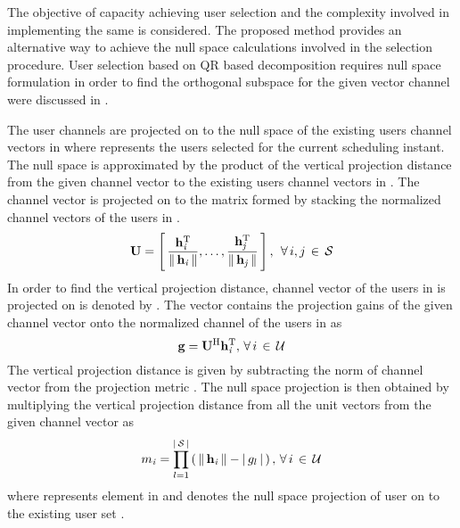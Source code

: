 
The objective of capacity achieving user selection and the complexity involved in implementing the same is considered. The proposed method provides an alternative way to achieve the null space calculations involved in the selection procedure. User selection based on QR based decomposition requires null space formulation in order to find the orthogonal subspace for the given vector channel were discussed in \cite{traniterative,zhang2007user,sun2009eigenmode,antti_user_selection}.

The user channels are projected on to the null space of the existing users channel vectors in  where  represents the users selected for the current scheduling instant. The null space is approximated by the product of the vertical projection distance from the given channel vector to the existing users channel vectors in . The channel vector  is projected on to the matrix  formed by stacking the normalized channel vectors of the users in .
\begin{equation}
\mathbf{U} = \left [ \, \frac{\mathbf{h}_{\mathit{i}}^{\mathrm{T}}}{\|\, \mathbf{h}_{\mathit{i}} \,\|}, \dotsc, \frac{\mathbf{h}_{\mathit{j}}^{\mathrm{T}}}{\|\, \mathbf{h}_{\mathit{j}} \,\|} \, \right ], \; \, \forall \, i,j \, \in \, \mathcal{S}
\label{mca2-e1}
\end{equation}
In order to find the vertical projection distance, channel vector of the users in  is projected on  is  denoted by . The vector  contains the projection gains of the given channel vector onto the normalized channel of the users in  as
\begin{equation}
\mathbf{g} = \mathbf{U}^{\mathrm{H}} \mathbf{h}_{\mathit{i}}^{\mathrm{T}}, \, \forall \, i \, \in \, \mathcal{U}
\label{mca2-e2}
\end{equation}
The vertical projection distance is given by subtracting the norm of channel vector from the projection metric . The null space projection is then obtained by multiplying the vertical projection distance from all the unit vectors from the given channel vector as
\begin{equation}
{m}_{\mathit{i}} = \prod^{| \, \mathcal{S} \, |}_{l = 1} \left ( \, \|\, \mathbf{h}_{\mathit{i}} \,\| - | \, g_l \, | \, \right ), \, \forall \, i \, \in \, \mathcal{U}
\label{mca2-e3}
\end{equation}
where  represents  element in  and  denotes the null space projection of user  on to the existing user set .

